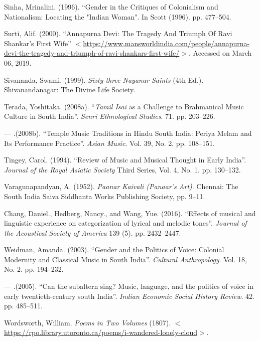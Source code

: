 \begin{thebibliography}{99}
  Sinha, Mrinalini. (1996). “Gender in the Critiques of Colonialism and Nationalism: Locating the "Indian Woman". In Scott (1996). pp. 477--504.

  Surti, Alif. (2000). “Annapurna Devi: The Tragedy And Triumph Of Ravi Shankar’s First Wife” $<$\url{https://www.mansworldindia.com/people/annapurna-devi-the-tragedy-and-triumph-of-ravi-shankars-first-wife/}$>$. Accessed on March 06, 2019.

  Sivananda, Swami. (1999). \textit{Sixty-three Nayanar Saints} (4th Ed.). Shivanandanagar: The Divine Life Society.

  Terada, Yoshitaka. (2008a). “\textit{Tamil Isai} as a Challenge to Brahmanical Music Culture in South India”. \textit{Senri Ethnological Studies}. 71. pp. 203--226.

  — .(2008b). “Temple Music Traditions in Hindu South India: Periya Melam and Its Performance Practice”. \textit{Asian Music}. Vol. 39, No. 2, pp. 108--151.

  Tingey, Carol. (1994). “Review of Music and Musical Thought in Early India”. \textit{Journal of the Royal Asiatic Society} Third Series, Vol. 4, No. 1. pp. 130--132.

  Varagunapandyan, A. (1952). \textit{Paanar Kaivali (Panaar's Art)}. Chennai: The South India Saiva Siddhanta Works Publishing Society, pp. 9--11.

  Chang, Daniel., Hedberg, Nancy., and Wang, Yue. (2016). “Effects of musical and linguistic experience on categorization of lyrical and melodic tones”. \textit{Journal of the Acoustical Society of America} 139 (5). pp. 2432--2447.

  Weidman, Amanda. (2003). “Gender and the Politics of Voice: Colonial Modernity and Classical Music in South India”. \textit{Cultural Anthropology}. Vol. 18, No. 2. pp. 194--232.

  — .(2005). “Can the subaltern sing? Music, language, and the politics of voice in early twentieth-century south India”. \textit{Indian Economic Social History Review}. 42. pp. 485--511.

  Wordsworth, William. \textit{Poems in Two Volumes} (1807). $<$\url{https://rpo.library.utoronto.ca/poems/i-wandered-lonely-cloud}$>$.

 \end{thebibliography}

